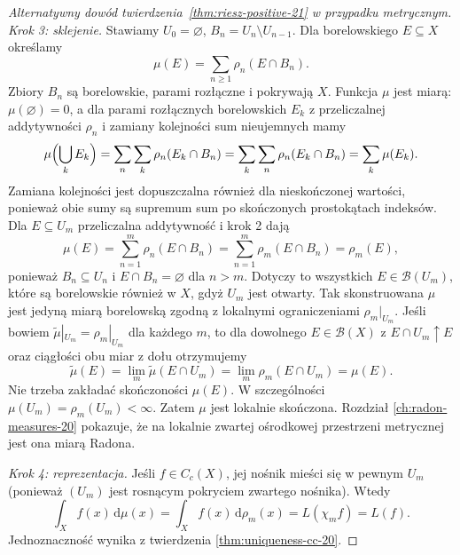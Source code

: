 \begin{proof}[Alternatywny dowód twierdzenia~\ref{thm:riesz-positive-21} w przypadku metrycznym]
\emph{Krok 3: sklejenie.}
Stawiamy $U_0=\varnothing$, $B_n=U_n\setminus U_{n-1}$.
Dla borelowskiego $E\subseteq X$ określamy
\begin{equation}\label{eq:gluing-measures-21}
 \mu(E)=\sum_{n\ge1}\rho_n(E\cap B_n).
\end{equation}
Zbiory $B_n$ są borelowskie, parami rozłączne
i pokrywają $X$. Funkcja $\mu$ jest miarą:
$\mu(\varnothing)=0$, a dla parami rozłącznych
borelowskich $E_k$ z przeliczalnej addytywności
$\rho_n$ i zamiany kolejności sum nieujemnych mamy
\[
 \mu\Bigl(\bigcup_k E_k\Bigr)
 =\sum_n\sum_k\rho_n(E_k\cap B_n)
 =\sum_k\sum_n\rho_n(E_k\cap B_n)
 =\sum_k\mu(E_k).
\]
Zamiana kolejności jest dopuszczalna również
dla nieskończonej wartości, ponieważ obie sumy
są supremum sum po skończonych prostokątach indeksów. Dla $E\subseteq U_m$
przeliczalna addytywność i krok 2 dają
\[
 \mu(E)=\sum_{n=1}^m\rho_n(E\cap B_n)
 =\sum_{n=1}^m\rho_m(E\cap B_n)=\rho_m(E),
\]
ponieważ $B_n\subseteq U_n$ i $E\cap B_n=\varnothing$
dla $n>m$. Dotyczy to wszystkich $E\in\mathcal B(U_m)$,
które są borelowskie również w $X$, gdyż $U_m$ jest otwarty.
Tak skonstruowana $\mu$ jest jedyną miarą borelowską
zgodną z lokalnymi ograniczeniami $\rho_m|_{U_m}$.
Jeśli bowiem $\widetilde\mu|_{U_m}=\rho_m|_{U_m}$
dla każdego $m$, to dla dowolnego $E\in\mathcal B(X)$
z $E\cap U_m\uparrow E$ oraz ciągłości obu miar z dołu
otrzymujemy
\[
 \widetilde\mu(E)=\lim_m\widetilde\mu(E\cap U_m)
 =\lim_m\rho_m(E\cap U_m)=\mu(E).
\]
Nie trzeba zakładać skończoności $\mu(E)$.
W szczególności $\mu(U_m)=\rho_m(U_m)<\infty$.
Zatem $\mu$ jest lokalnie skończona. Rozdział
\ref{ch:radon-measures-20} pokazuje, że na lokalnie
zwartej ośrodkowej przestrzeni metrycznej jest ona
miarą Radona.

\emph{Krok 4: reprezentacja.}
Jeśli $f\in C_c(X)$, jej nośnik mieści się w pewnym
$U_m$ (ponieważ $(U_m)$ jest rosnącym pokryciem
zwartego nośnika). Wtedy
\[
 \int_X f(x)\,\mathrm d\mu(x)
 =\int_X f(x)\,\mathrm d\rho_m(x)
 =L(\chi_m f)=L(f).
\]
Jednoznaczność wynika z twierdzenia
\ref{thm:uniqueness-cc-20}.
\end{proof}

